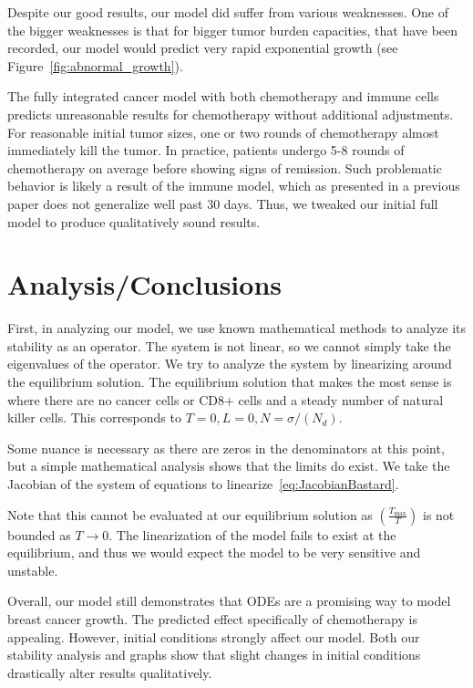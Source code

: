 \documentclass[11pt]{amsart}
\begin{document}
Despite our good results, our model did suffer from various weaknesses.
One of the bigger weaknesses is that for bigger tumor burden capacities, that have been recorded, our model would predict very rapid exponential growth (see Figure~\ref{fig:abnormal_growth}).

The fully integrated cancer model with both chemotherapy and immune cells predicts unreasonable results for chemotherapy without additional adjustments. For reasonable initial tumor sizes, one or two rounds of chemotherapy almost immediately kill the tumor. In practice, patients undergo 5-8 rounds of chemotherapy on average before showing signs of remission. Such problematic behavior is likely a result of the immune model, which as presented in a previous paper does not generalize well past 30 days. Thus, we tweaked our initial full model to produce qualitatively sound results.


\section{Analysis/Conclusions}

First, in analyzing our model, we use known mathematical methods to analyze its stability as an operator.
The system is not linear, so we cannot simply take the eigenvalues of the operator. 
We try to analyze the system by linearizing around the equilibrium solution. 
The equilibrium solution that makes the most sense is where there are no cancer cells or CD8+ cells and a steady number of natural killer cells. 
This corresponds to $T=0, L=0, N=\sigma/(N_d)$.   

Some nuance is necessary as there are zeros in the denominators at this point, but a simple mathematical analysis shows that the limits do exist. 
We take the Jacobian of the system of equations to linearize\ \eqref{eq:JacobianBastard}. 

Note that this cannot be evaluated at our equilibrium solution as $\left(\frac{T_{\max}}{T}\right)$ is not bounded as $T \rightarrow 0$. 
The linearization of the model fails to exist at the equilibrium, and thus we would expect the model to be very sensitive and unstable.

Overall, our model still demonstrates that ODEs are a promising way to model breast cancer growth. 
The predicted effect specifically of chemotherapy is appealing. 
However, initial conditions strongly affect our model.
Both our stability analysis and graphs show that slight changes in initial conditions drastically alter results qualitatively.
\end{document}
